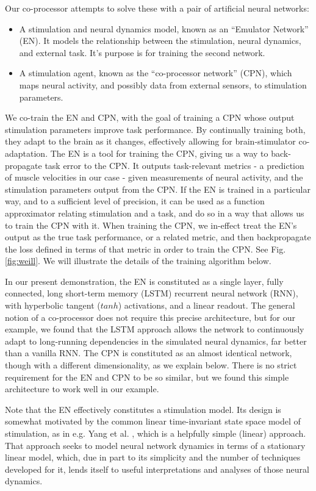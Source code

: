 \documentclass[12pt]{iopart}
\begin{document}
Our co-processor attempts to solve these with a pair of artificial neural networks:
\begin{itemize}
	\item A stimulation and neural dynamics model, known as an ``Emulator Network'' (EN). It models the relationship
	      between the stimulation, neural dynamics, and external task. It's purpose is for training the second network.
	\item A stimulation agent, known as the ``co-processor network'' (CPN), which maps neural activity, and possibly
	      data from external sensors, to stimulation parameters.
\end{itemize}

We co-train the EN and CPN, with the goal of training a CPN whose output stimulation parameters
improve task performance. By continually training both, they adapt to the brain as it changes,
effectively allowing for brain-stimulator co-adaptation. The EN is a tool for training the CPN,
giving us a way to back-propagate task error to the CPN. It outputs task-relevant
metrics - a prediction of muscle velocities in our case - given measurements of neural
activity, and the stimulation parameters output from the CPN. If the EN is trained in a
particular way, and to a sufficient level of precision, it can be used as a function
approximator relating stimulation and a task, and do so in a way that allows us to train
the CPN with it. When training the CPN, we in-effect treat the EN's output as the true
task performance, or a related metric, and then backpropagate the loss defined in terms
of that metric in order to train the CPN. See Fig. \ref{fig:weill}. We will illustrate the details
of the training algorithm below.

In our present demonstration, the EN is constituted as a single layer, fully connected,
long short-term memory (LSTM) recurrent neural network (RNN), with hyperbolic tangent ($tanh$)
activations, and a linear readout. The general notion of a co-processor does
not require this precise architecture, but for our example, we found that the LSTM
approach allows the network to continuously adapt to long-running dependencies in
the simulated neural dynamics, far better than a vanilla RNN. The CPN is constituted
as an almost identical network, though with a different dimensionality, as we explain
below. There is no strict requirement for the EN and CPN to be so similar, but we
found this simple architecture to work well in our example.

Note that the EN effectively constitutes a stimulation model. Its design is
somewhat motivated by the common linear time-invariant state space model of
stimulation, as in e.g. Yang et al. \cite{shanechi.stimmodel}, which is a helpfully
simple (linear) approach. That approach seeks to model neural network dynamics in
terms of a stationary linear model, which, due in part to its simplicity and the
number of techniques developed for it, lends itself to useful interpretations and
analyses of those neural dynamics.
\end{document}

